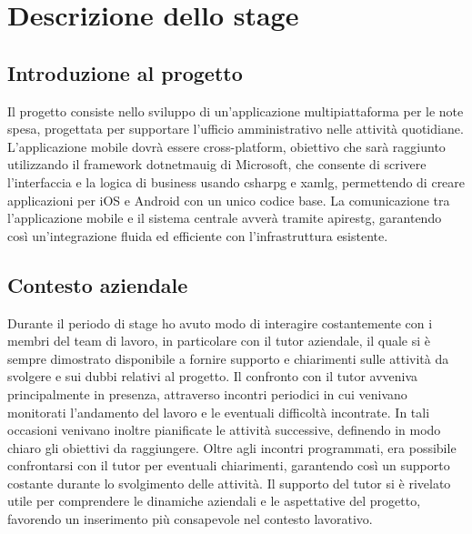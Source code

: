 \chapter{Descrizione dello stage}
\label{chap:descrizione-stage}

\section{Introduzione al progetto}
\noindent Il progetto consiste nello sviluppo di un'applicazione multipiattaforma per le note spesa, progettata per supportare l'ufficio amministrativo nelle attività quotidiane. L'applicazione mobile dovrà essere cross-platform, obiettivo che sarà raggiunto utilizzando il framework \gls{dotnetmauig} di Microsoft, che consente di scrivere l'interfaccia e la logica di business usando \gls{csharpg} e \gls{xamlg}, permettendo di creare applicazioni per iOS e Android con un unico codice base. La comunicazione tra l'applicazione mobile e il sistema centrale avverà tramite \gls{apirestg}, garantendo così un'integrazione fluida ed efficiente con l'infrastruttura esistente. 


\section{Contesto aziendale}
\noindent Durante il periodo di stage ho avuto modo di interagire costantemente con i membri del team di lavoro, in particolare con il tutor aziendale, il quale si è sempre dimostrato disponibile a fornire supporto e chiarimenti sulle attività da svolgere e sui dubbi relativi al progetto. 
Il confronto con il tutor avveniva principalmente in presenza, attraverso incontri periodici in cui venivano monitorati l'andamento del lavoro e le eventuali difficoltà incontrate. In tali occasioni venivano inoltre pianificate le attività successive, definendo in modo chiaro gli obiettivi da raggiungere. 
Oltre agli incontri programmati, era possibile confrontarsi con il tutor per eventuali chiarimenti, garantendo così un supporto costante durante lo svolgimento delle attività.
Il supporto del tutor si è rivelato utile per comprendere le dinamiche aziendali e le aspettative del progetto, favorendo un inserimento più consapevole nel contesto lavorativo. 


